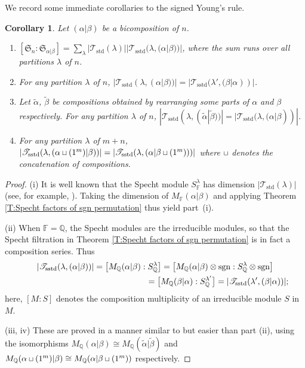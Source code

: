\documentclass[pdftex]{sigma}
\newtheorem{Corollary}[Theorem]{Corollary}
\newcommand{\TT}{\mathscr{T}}
\newcommand{\TTS}{\mathscr{T}_\mathrm{sstd}}
\newcommand{\sgn}{\mathrm{sgn}}
\newcommand{\sym}[1]{\mathfrak{S}_{#1}}
\newcommand{\F}{\mathbb{F}}
\newcommand{\Q}{\mathbb{Q}}
\newcommand{\squ}{\mathbin{{\text{\footnotesize $\sqcup$}}}}
\begin{document}
We record some immediate corollaries to the signed Young's rule.

\begin{Corollary} Let $(\alpha|\beta)$ be a bicomposition of $n$.
\begin{enumerate}\itemsep=0pt
\item [$(i)$] $[\sym{n} \colon \sym{\alpha|\beta}] = \sum_{\lambda} |\TT_{\mathrm{std}}(\lambda)| |\TTS(\lambda,(\alpha|\beta))|$, where the sum runs over all partitions $\lambda$ of $n$.
\item [$(ii)$] For any partition $\lambda$ of $n$, $|\TTS(\lambda, (\alpha|\beta))|=|\TTS(\lambda',(\beta|\alpha))|$.
\item [$(iii)$] Let $\tilde{\alpha}$, $\tilde{\beta}$ be compositions obtained by rearranging some parts of $\alpha$ and $\beta$ respectively. For any partition $\lambda$ of $n$, $|\TTS(\lambda, (\tilde{\alpha}|\tilde{\beta}))|=|\TTS(\lambda, (\alpha|\beta))|$.
\item [$(iv)$] For any partition $\lambda$ of $m+n$, $|\TTS(\lambda, (\alpha \squ (1^m)|\beta))|=|\TTS(\lambda, (\alpha|\beta \squ (1^m)))|$ where $\squ$ denotes the concatenation of compositions.
\end{enumerate}
\end{Corollary}

\begin{proof} (i) It is well known that the Specht module $S_\F^{\lambda}$ has dimension $|\TT_{\mathrm{std}}(\lambda)|$ (see, for example, \cite[Theorem~1.1]{Peel}). Taking the dimension of $M_\F(\alpha|\beta)$ and applying Theorem \ref{T:Specht factors of sgn permutation} thus yield part~(i).

(ii) When $\F = \mathbb{Q}$, the Specht modules are the irreducible modules, so that the Specht filtration in Theorem \ref{T:Specht factors of sgn permutation} is in fact a composition series. Thus
\begin{gather*}
|\TTS(\lambda, (\alpha|\beta))|= \big[M_{\mathbb{Q}}(\alpha|\beta):S_{\mathbb{Q}}^\lambda\big] = \big[M_{\mathbb{Q}}(\alpha|\beta)\otimes\sgn:S_{\mathbb{Q}}^\lambda\otimes\sgn\big]\\
\hphantom{|\TTS(\lambda, (\alpha|\beta))|= \big[M_{\mathbb{Q}}(\alpha|\beta):S_{\mathbb{Q}}^\lambda\big]}{} =\big[M_{\mathbb{Q}}(\beta|\alpha):S_\mathbb{Q}^{\lambda'}\big]=|\TTS(\lambda',(\beta|\alpha))|;
\end{gather*} here, $[M:S]$ denotes the composition multiplicity of an irreducible module $S$ in $M$.

(iii, iv) These are proved in a manner similar to but easier than part (ii), using the isomorphisms $M_\Q(\alpha|\beta)\cong M_\Q(\tilde{\alpha}|\tilde{\beta})$ and $M_\Q(\alpha\squ(1^m)|\beta)\cong M_\Q(\alpha|\beta\squ(1^m))$ respectively.
\end{proof}
\end{document}
